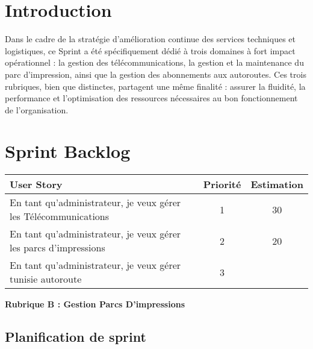 \documentclass[a4paper,11pt]{report}
\begin{document}
\newpage
\setcounter{section}{0}

\section{Introduction}

Dans le cadre de la stratégie d’amélioration continue des services techniques et logistiques, ce Sprint a été spécifiquement dédié à trois domaines à fort impact opérationnel : la gestion des télécommunications, la gestion et la maintenance du parc d’impression, ainsi que la gestion des abonnements aux autoroutes. Ces trois rubriques, bien que distinctes, partagent une même finalité : assurer la fluidité, la performance et l’optimisation des ressources nécessaires au bon fonctionnement de l'organisation.

\section{Sprint Backlog}

\begin{table}[h]
\centering
\begin{tabular}{|>{\raggedright\arraybackslash}p{7cm}|c|c|}
\hline
\textbf{User Story} & \textbf{Priorité} & \textbf{Estimation} \\
\hline
En tant qu’administrateur, je veux gérer les Télécommunications 
& 1 & 30 \\
\hline
En tant qu’administrateur, je veux gérer les parcs d’impressions 
& 2 & 20 \\
\hline
En tant qu’administrateur, je veux gérer tunisie autoroute 
& 3 &  \\
\hline
\end{tabular}
\end{table}
\newpage


\textbf{Rubrique B : Gestion  Parcs D'impressions}
\subsection{Planification de sprint }
\end{document}
